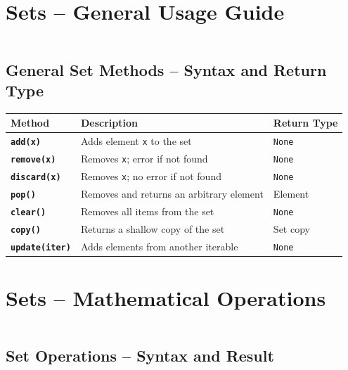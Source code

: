 \documentclass[a4paper,11pt]{article}
\begin{document}
	
		\newpage
		
	\section{Sets – General Usage Guide}
	\inputminted{python}{Python_Files/sets_guid_general.py}
	
	\vspace{1em}
	\subsection*{General Set Methods – Syntax and Return Type}
	
	\begin{tabular}{>{\bfseries}p{3.5cm} p{7cm} p{3cm}}
		\toprule
		Method & Description & Return Type \\
		\midrule
		
		\texttt{add(x)}       & Adds element \texttt{x} to the set & \texttt{None} \\
		\texttt{remove(x)}    & Removes \texttt{x}; error if not found & \texttt{None} \\
		\texttt{discard(x)}   & Removes \texttt{x}; no error if not found & \texttt{None} \\
		\texttt{pop()}        & Removes and returns an arbitrary element & Element \\
		\texttt{clear()}      & Removes all items from the set & \texttt{None} \\
		\texttt{copy()}       & Returns a shallow copy of the set & Set copy \\
		\texttt{update(iter)} & Adds elements from another iterable & \texttt{None} \\
		
		\bottomrule
	\end{tabular}
	
	
		\newpage
	
	\section{Sets – Mathematical Operations}
	\inputminted{python}{Python_Files/sets_math_guid.py}
	
	\vspace{1em}
	\subsection*{Set Operations – Syntax and Result}
	
\end{document}
